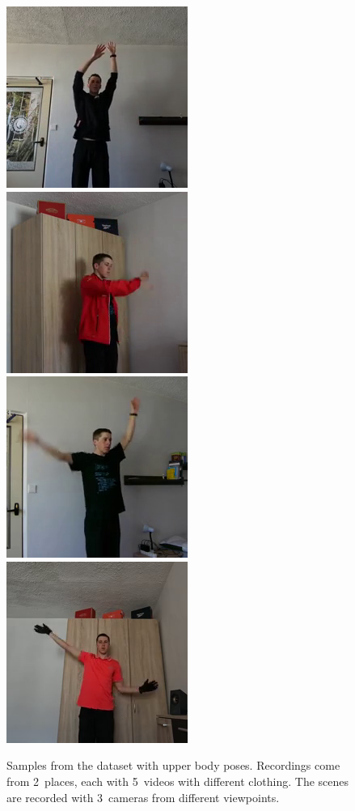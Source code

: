 \begin{figure}[!ht]
{    }
    \vspace{0.1cm}
    \centerline{
        \includegraphics[scale=0.46]{figures/dataset_upper_body/scene023_cam1_image00035.png}
        \includegraphics[scale=0.46]{figures/dataset_upper_body/scene028_cam0_image00247.png}
        \includegraphics[scale=0.46]{figures/dataset_upper_body/scene021_cam0_image00044.png}
        \includegraphics[scale=0.46]{figures/dataset_upper_body/scene029_cam1_image00142.png}
    }
    \caption{Samples from the dataset with upper body poses. Recordings come from 2~places, each with 5~videos with different clothing. The scenes are recorded with 3~cameras from different viewpoints.}
    \label{fig:dataset-upper-body-example}
\end{figure}


